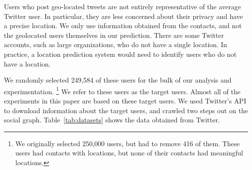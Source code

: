 \documentclass[letterpaper]{article}
\begin{document}
Users who post geo-located tweets are not entirely representative of the
average Twitter user.
%
In particular, they are less concerned about their privacy and have a precise
location.
%
We only use information obtained from the contacts, and not the geolocated
users themselves in our prediction.
%
There are some Twitter accounts, such as large organizations, who do not have a
single location.
%
In practice, a location prediction system would need to identify users who do
not have a location.


%

We randomly selected 249,584 of these users for the bulk of our analysis and
experimentation.
\ifdefined\THESIS
\footnote{We originally selected 250,000 users, but had to remove 416 of them.
These users had contacts with locations, but none of their contacts had
meaningful locations.}
\fi
%
We refer to these users as the target users.
%
Almost all of the experiments in this paper are based on these target
users.
%
We used Twitter's API to download information about the target users, and
crawled two steps out on the social graph.
%
Table~\ref{tab:datasets} shows the data obtained from Twitter.

\end{document}
